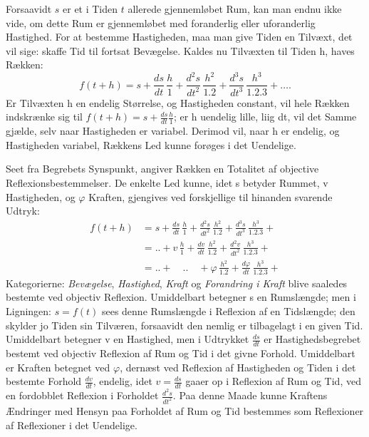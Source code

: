 \documentclass[12pt]{book}
\newcommand{\opage}[1]{\marginnote{\footnotesize\textit{[#1]}}}
\begin{document}
Forsaavidt $s$ er et i Tiden $t$ allerede gjennemløbet Rum, kan man endnu ikke
vide, om dette Rum er gjennemløbet med foranderlig eller uforanderlig Hastighed.
For at bestemme Hastigheden, maa man give Tiden en Tilvæxt, det
\opage{166} vil sige: skaffe Tid til fortsat Bevægelse. Kaldes nu Tilvæxten til Tiden h,
haves Rækken:
\[ f(t+h) = s + \frac{ds}{dt}\,\frac{h}{1} + \frac{d^2 s}{dt^2}\,\frac{h^2}{1.2}
+ \frac{d^3 s}{dt^3}\,\frac{h^3}{1.2.3} + \ldots. \]
Er Tilvæxten h en endelig Størrelse, og Hastigheden constant, vil hele Rækken
indskrænke sig til $f(t+h) = s + \frac{ds}{dt}\frac{h}{1}$; er h uendelig lille,
liig dt, vil det Samme gjælde, selv naar Hastigheden er variabel. Derimod vil,
naar h er endelig, og Hastigheden variabel, Rækkens Led kunne forøges i det
Uendelige.

Seet fra Begrebets Synspunkt, angiver Rækken en Totalitet af objective
Reflexionsbestemmelser. De enkelte Led kunne, idet s betyder Rummet, v
Hastigheden, og $\varphi$ Kraften, gjengives ved forskjellige til hinanden
svarende Udtryk:
\[ \begin{aligned}
f(t+h) &= s + \frac{ds}{dt}\,\frac{h}{1} + \frac{d^2 s}{dt^2}\,\frac{h^2}{1.2} +
\frac{d^3 s}{dt^3}\,\frac{h^3}{1.2.3} + \\
&= .. + v\,\frac{h}{1} + \frac{dv}{dt}\,\frac{h^2}{1.2} + \frac{d^2 v}{dt^2}\,\frac{h^3}{1.2.3} + \\
&= .. + \quad .. \quad + \varphi\,\frac{h^2}{1.2} + \frac{d\varphi}{dt}\,\frac{h^3}{1.2.3} +
\end{aligned} \]
Kategorierne: \emph{Bevægelse}, \emph{Hastighed}, \emph{Kraft} og \emph{Forandring
i Kraft} blive saaledes bestemte ved objectiv Reflexion. Umiddelbart betegner s
en Rumslængde; men i Ligningen: $s = f(t)$ sees denne Rumslængde i Reflexion af
en Tidslængde; den skylder jo Tiden sin Tilværen, forsaavidt den nemlig er
tilbagelagt i en given Tid. Umiddelbart betegner v en Hastighed, men i Udtrykket
$\frac{ds}{dt}$ er Hastighedsbegrebet bestemt ved objectiv Reflexion af Rum og
Tid i det givne Forhold. Umiddelbart er Kraften betegnet ved $\varphi$, dernæst
ved Reflexion af Hastigheden og Tiden i det bestemte Forhold $\frac{dv}{dt}$,
endelig, idet $v = \frac{ds}{dt}$ gaaer op i Reflexion af Rum og Tid, ved en
fordobblet Reflexion i Forholdet
\opage{167} $\frac{d^2 s}{dt^2}$. Paa denne Maade kunne Kraftens Ændringer med Hensyn paa
Forholdet af Rum og Tid bestemmes som Reflexioner af Reflexioner i det Uendelige.
\end{document}
